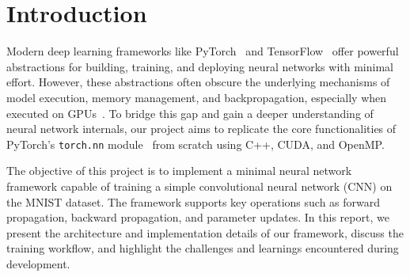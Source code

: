 \section{Introduction}

Modern deep learning frameworks like PyTorch~\cite{pytorch_tutorial, techtarget_pytorch} and TensorFlow~\cite{tensorflow_wiki} offer powerful abstractions for building, training, and deploying neural networks with minimal effort. However, these abstractions often obscure the underlying mechanisms of model execution, memory management, and backpropagation, especially when executed on GPUs~\cite{builtin_tf_vs_pytorch}. To bridge this gap and gain a deeper understanding of neural network internals, our project aims to replicate the core functionalities of PyTorch's \texttt{torch.nn} module~\cite{pytorch_nn_example} from scratch using C++, CUDA, and OpenMP.

The objective of this project is to implement a minimal neural network framework capable of training a simple convolutional neural network (CNN) on the MNIST dataset. The framework supports key operations such as forward propagation, backward propagation, and parameter updates. In this report, we present the architecture and implementation details of our framework, discuss the training workflow, and highlight the challenges and learnings encountered during development.

